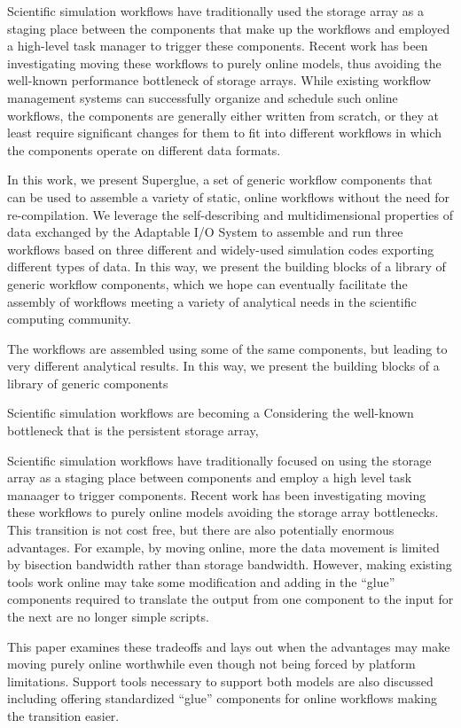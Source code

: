 Scientific simulation workflows have traditionally used
the storage array as a staging place between the components
that make up the workflows
and employed a high-level task manager to trigger these components.
Recent work has been investigating moving these
workflows to purely online models, thus avoiding the 
well-known performance bottleneck of storage arrays.
While existing workflow management systems
can successfully organize and schedule such online workflows, the components
are generally either written from
scratch, or they at least require significant
changes for them to fit
into different workflows
in which the components
operate on different
data formats.

In this work, we present Superglue,
a set of generic workflow components
that can be used to assemble a variety of static, online
workflows without the need for re-compilation.
We leverage the self-describing and multidimensional properties
of data exchanged by the Adaptable
I/O System to assemble and run three workflows
based on three different and widely-used simulation codes
exporting different types of data.
In this way, we present the building blocks of a library
of generic workflow components, which we hope can
eventually facilitate the assembly of
workflows meeting a variety of analytical needs
in the scientific computing community.

The workflows are assembled using
some of the same components, but leading to very different analytical results.
In this way, we present the building blocks of a library of generic components


Scientific simulation workflows are becoming a 
Considering the well-known bottleneck that is the persistent storage array,


Scientific simulation workflows have traditionally focused on using the storage
array as a staging place between components and employ a high level task
manaager to trigger components. Recent work has been investigating moving these
workflows to purely online models avoiding the storage array bottlenecks. This
transition is not cost free, but there are also potentially enormous advantages.
For example, by moving online, more the data movement is limited by bisection
bandwidth rather than storage bandwidth. However, making existing tools work
online may take some modification and adding in the ``glue'' components required
to translate the output from one component to the input for the next are no
longer simple scripts.

This paper examines these tradeoffs and lays out when the advantages may make
moving purely online worthwhile even though not being forced by platform
limitations. Support tools necessary to support both models are also discussed
including offering standardized ``glue'' components for online workflows making
the transition easier.
\endif
